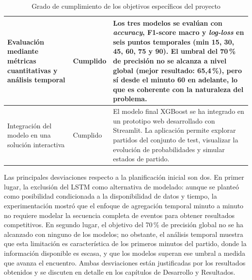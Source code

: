 \begin{table}[H]
\begin{tabularx}{\textwidth}{|p{5cm}|p{2.8cm}|X|}
        Evaluación mediante métricas cuantitativas y análisis temporal     & Cumplido              & Los tres modelos se evalúan con \textit{accuracy}, F1-score macro y \textit{log-loss} en seis puntos temporales (min 15, 30, 45, 60, 75 y 90). El umbral del 70\,\% de precisión no se alcanza a nivel global (mejor resultado: 65,4\,\%), pero sí desde el minuto 60 en adelante, lo que es coherente con la naturaleza del problema. \\
        \hline
        Integración del modelo en una solución interactiva                 & Cumplido              & El modelo final XGBoost se ha integrado en un prototipo web desarrollado con Streamlit. La aplicación permite explorar partidos del conjunto de test, visualizar la evolución de probabilidades y simular estados de partido.                                                                                                          \\
        \hline
    \end{tabularx}
    \caption{Grado de cumplimiento de los objetivos específicos del proyecto}
    \label{tab:cumplimiento}
\end{table}

Las principales desviaciones respecto a la planificación inicial son dos. En primer lugar, la exclusión del LSTM como alternativa de modelado: aunque se planteó como posibilidad condicionada a la disponibilidad de datos y tiempo, la experimentación mostró que el enfoque de agregación temporal minuto a minuto no requiere modelar la secuencia completa de eventos para obtener resultados competitivos. En segundo lugar, el objetivo del 70\,\% de precisión global no se ha alcanzado con ninguno de los modelos; no obstante, el análisis temporal muestra que esta limitación es característica de los primeros minutos del partido, donde la información disponible es escasa, y que los modelos superan ese umbral a medida que avanza el encuentro. Ambas desviaciones están justificadas por los resultados obtenidos y se discuten en detalle en los capítulos de Desarrollo y Resultados.
